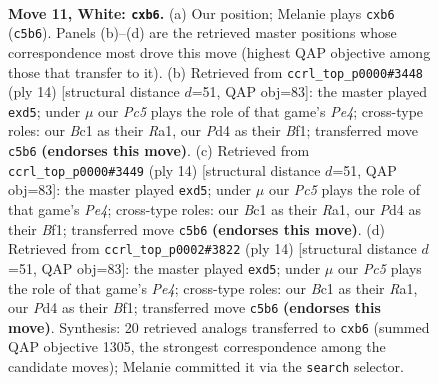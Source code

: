 \documentclass[11pt]{article}
\begin{document}
\clearpage

\begin{figure}[p]\centering
\begin{subfigure}{0.46\textwidth}\centering
\resizebox{\linewidth}{!}{%
\newchessgame
\chessboard[
  setfen={rnbqk2r/4bp2/1p2pnp1/p1Pp3p/3P3N/2N4P/PP3PP1/R1BQKBR1 w Qkq - 0 11},
  showmover=false,
  pgfstyle=straightmove, color=movearrow, markmove={c5-b6}
]}
\caption{}
\end{subfigure}\hfill
\begin{subfigure}{0.46\textwidth}\centering
\resizebox{\linewidth}{!}{%
\newchessgame
\chessboard[
  setfen={rnbqkb1r/1p3ppp/p3pn2/3p4/3NP1P1/2N4P/PPP2P2/R1BQKB1R w KQkq - 0 8},
  showmover=false,
  pgfstyle=straightmove, color=movearrow, markmove={e4-d5}
]}
\caption{}
\end{subfigure}
\\[4pt]
\begin{subfigure}{0.46\textwidth}\centering
\resizebox{\linewidth}{!}{%
\newchessgame
\chessboard[
  setfen={rnbqkb1r/1p3ppp/p3pn2/3p4/3NP1P1/2N4P/PPP2P2/R1BQKB1R w KQkq - 0 8},
  showmover=false,
  pgfstyle=straightmove, color=movearrow, markmove={e4-d5}
]}
\caption{}
\end{subfigure}\hfill
\begin{subfigure}{0.46\textwidth}\centering
\resizebox{\linewidth}{!}{%
\newchessgame
\chessboard[
  setfen={rnbqkb1r/1p3ppp/p3pn2/3p4/3NP1P1/2N4P/PPP2P2/R1BQKB1R w KQkq - 0 8},
  showmover=false,
  pgfstyle=straightmove, color=movearrow, markmove={e4-d5}
]}
\caption{}
\end{subfigure}
\caption{\textbf{Move 11, White: \texttt{cxb6}.} (a) Our position; Melanie plays \texttt{cxb6} (\texttt{c5b6}). Panels (b)--(d) are the retrieved master positions whose correspondence most drove this move (highest QAP objective among those that transfer to it). (b) Retrieved from \texttt{ccrl\_top\_p0000\#3448} (ply 14) [structural distance $d$=51, QAP obj=83]: the master played \texttt{exd5}; under $\mu$ our \emph{Pc5} plays the role of that game's \emph{Pe4}; cross-type roles: our \emph{B}c1 as their \emph{R}a1, our \emph{P}d4 as their \emph{B}f1; transferred move \texttt{c5b6} \textbf{(endorses this move)}. (c) Retrieved from \texttt{ccrl\_top\_p0000\#3449} (ply 14) [structural distance $d$=51, QAP obj=83]: the master played \texttt{exd5}; under $\mu$ our \emph{Pc5} plays the role of that game's \emph{Pe4}; cross-type roles: our \emph{B}c1 as their \emph{R}a1, our \emph{P}d4 as their \emph{B}f1; transferred move \texttt{c5b6} \textbf{(endorses this move)}. (d) Retrieved from \texttt{ccrl\_top\_p0002\#3822} (ply 14) [structural distance $d$=51, QAP obj=83]: the master played \texttt{exd5}; under $\mu$ our \emph{Pc5} plays the role of that game's \emph{Pe4}; cross-type roles: our \emph{B}c1 as their \emph{R}a1, our \emph{P}d4 as their \emph{B}f1; transferred move \texttt{c5b6} \textbf{(endorses this move)}. Synthesis: 20 retrieved analogs transferred to \texttt{cxb6} (summed QAP objective 1305, the strongest correspondence among the candidate moves); Melanie committed it via the \texttt{search} selector.}
\label{fig:thought-m20}
\end{figure}
\end{document}
